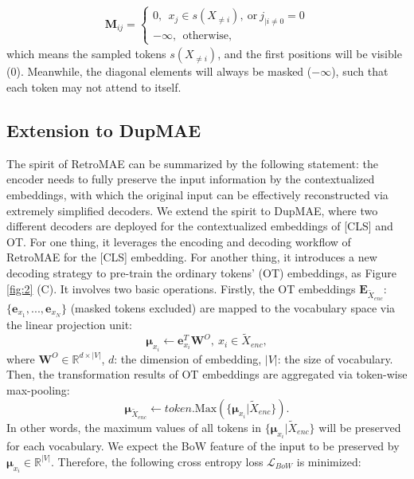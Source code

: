 \documentclass[11pt,a4paper]{article}
\begin{document}
\begin{equation}\label{eq:7}
\begin{gathered}
\mathbf{M}_{ij} = 
    \begin{cases}
    0,   ~~ x_j \in s(X_{\neq i}), ~\text{or}~ j_{{|i\neq0}}=0 \\
    -\infty,  ~~ \text{otherwise},
    \end{cases} 
\end{gathered}
\end{equation}
which means the sampled tokens $s(X_{\neq i})$, and the first positions will be visible ($0$). Meanwhile, the diagonal elements will always be masked ($-\infty$), such that each token may not attend to itself.  




\subsection{Extension to DupMAE}\label{sec:method-dup}
The spirit of RetroMAE can be summarized by the following statement: the encoder needs to fully preserve the input information by the contextualized embeddings, with which the original input can be effectively reconstructed via extremely simplified decoders. We extend the spirit to DupMAE, where two different decoders are deployed for the contextualized embeddings of [CLS] and OT. For one thing, it leverages the encoding and decoding workflow of RetroMAE for the [CLS] embedding. For another thing, it introduces a new decoding strategy to pre-train the ordinary tokens' (OT) embeddings, as Figure \ref{fig:2} (C). It involves two basic operations. Firstly, the OT embeddings $\mathbf{E}_{\tilde{X}_{enc}}$: $\{\mathbf{e}_{x_1}, ..., \mathbf{e}_{x_N}\}$ (masked tokens excluded) are mapped to the vocabulary space via the linear projection unit: 
\begin{equation}\label{eq:8}
    \boldsymbol{\mu}_{x_i} \leftarrow \mathbf{e}_{x_i}^T\mathbf{W}^O, 
    ~ x_i \in \tilde{X}_{enc},
\end{equation}
where $\mathbf{W}^O \in \mathbb{R}^{d \times |V|}$, $d$: the dimension of embedding, $|V|$: the size of vocabulary. Then, the transformation results of OT embeddings are aggregated via token-wise max-pooling:
\begin{equation}\label{eq:9}
    \boldsymbol{\mu}_{\tilde{X}_{enc}} \leftarrow token.\mathrm{Max}(\{\boldsymbol{\mu}_{x_i}|\tilde{X}_{enc}\}).
\end{equation}
In other words, the maximum values of all tokens in $\{\boldsymbol{\mu}_{x_i}|\tilde{X}_{enc}\}$ will be preserved for each vocabulary. We expect the BoW feature of the input to be preserved by $\boldsymbol{\mu}_{x_i} \in \mathbb{R}^{|V|}$. Therefore, the following cross entropy loss $\mathcal{L}_{BoW}$ is minimized: 
\end{document}
